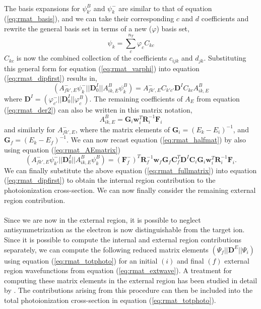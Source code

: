 \\
The basis expansions for $\psi^B_{k'}$ and $\psi^-_{k}$ are similar to that of equation (\ref{eq:rmat_basis}), and we can take their corresponding $c$ and $d$ coefficients and rewrite the general basis set in terms of a new ($\varphi$) basis set,
\begin{equation}\label{eq:rmat_varphi}
\psi_k = \sum_c^{n_T}\varphi_cC_{kc}
\end{equation}
$C_{kc}$ is now the combined collection of the coefficients $c_{ijk}$ and $d_{jk}$. Substituting this general form for equation (\ref{eq:rmat_varphi}) into equation (\ref{eq:rmat_dipfirst}) results in,
\begin{equation}\label{eq:rmat_halfmat}
(A^-_{fk',E}\psi^-_{k} || \boldsymbol{D}_0^I || A^B_{ik,E}\psi^B_{k}) = A^-_{fk',E}C_{k'c'}\boldsymbol{D}^I C_{kc}A^B_{ik,E}
\end{equation}
where $\boldsymbol{D}^I=(\varphi^-_{c'} || \boldsymbol{D}_0^I || \varphi^B_{c})$. The remaining coefficients of $A_E$ from equation (\ref{eq:rmat_der2}) can also be written in this matrix notation,
\begin{equation}\label{eq:rmat_AEmatrix}
A^B_{ik,E} = \boldsymbol{G}_i\boldsymbol{w}^T_i\boldsymbol{R}^{-1}_i\boldsymbol{F}_i
\end{equation}
and similarly for $A^{-}_{fk',E}$, where the matrix elements of $\boldsymbol{G}_i = (E_k-E_i)^{-1}$, and $\boldsymbol{G}_f = (E_k-E_f)^{-1}$. We can now recast equation (\ref{eq:rmat_halfmat}) by also using equation (\ref{eq:rmat_AEmatrix})
\begin{equation}\label{eq:rmat_fullmatrix}
(A^-_{fk',E}\psi^-_{k'} || \boldsymbol{D}_0^I || A^B_{ik,E}\psi^B_{k}) = (\boldsymbol{F}^{-}_f)^T\boldsymbol{R}^{-1}_f\boldsymbol{w}_f\boldsymbol{G}_f   \boldsymbol{C}^T_f\boldsymbol{D}^I \boldsymbol{C}_i\boldsymbol{G}_i\boldsymbol{w}^T_i\boldsymbol{R}^{-1}_i\boldsymbol{F}_i.
\end{equation}
We can finally substitute the above equation (\ref{eq:rmat_fullmatrix}) into equation (\ref{eq:rmat_dipfirst}) to obtain the internal region contribution to the photoionization cross-section. We can now finally consider the remaining external region contribution.\\

\\
Since we are now in the external region, it is possible to neglect antisymmetrization as the electron is now distinguishable from the target ion. Since it is possible to compute the internal and external region contributions separately, we can compute the following reduced matrix elements $(\Psi_f || \boldsymbol{D}^E || \Psi_i)$ using equation (\ref{eq:rmat_totphoto}) for an initial $(i)$ and final $(f)$ external region wavefunctions from equation (\ref{eq:rmat_extwave}). A treatment for computing these matrix elements in the external region has been studied in detail by \citet{1986JPhB...19.2601S}. The contributions arising from this procedure can then be included into the total photoionization cross-section in equation (\ref{eq:rmat_totphoto}).

